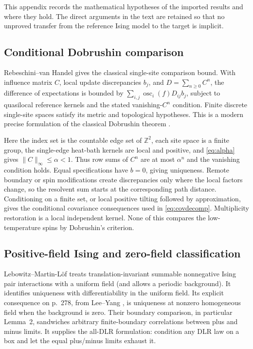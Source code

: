 \documentclass[11pt,reqno]{amsart}
\numberwithin{equation}{section}
\theoremstyle{definition}
\theoremstyle{remark}
\newcommand{\Z}{\mathbb Z}
\newcommand{\osc}{\operatorname{osc}}
\newcommand{\norm}[1]{\lVert#1\rVert}
\begin{document}
This appendix records the mathematical hypotheses of the imported results and where they hold. The direct arguments in the text are retained so that no unproved transfer from the reference Ising model to the target is implicit.

\subsection{Conditional Dobrushin comparison}
Rebeschini--van Handel \cite[Corollary~2.6, arXiv version~1]{RebeschiniVanHandel2014} gives the classical single-site comparison bound. With influence matrix $C$, local update discrepancies $b_j$, and $D=\sum_{n\geq0}C^n$, the difference of expectations is bounded by $\sum_{i,j}\osc_i(f)D_{ij}b_j$, subject to quasilocal reference kernels and the stated vanishing-$C^n$ condition. Finite discrete single-site spaces satisfy its metric and topological hypotheses. This is a modern precise formulation of the classical Dobrushin theorem \cite{Dobrushin1968}.

Here the index set is the countable edge set of $\Z^2$, each site space is a finite group, the single-edge heat-bath kernels are local and positive, and \eqref{eq:alpha} gives $\norm C_\infty\leq\alpha<1$. Thus row sums of $C^n$ are at most $\alpha^n$ and the vanishing condition holds. Equal specifications have $b=0$, giving uniqueness. Remote boundary or spin modifications create discrepancies only where the local factors change, so the resolvent sum starts at the corresponding path distance. Conditioning on a finite set, or local positive tilting followed by approximation, gives the conditional covariance consequences used in \eqref{eq:covdecomp}. Multiplicity restoration is a local independent kernel. None of this compares the low-temperature spins by Dobrushin's criterion.

\subsection{Positive-field Ising and zero-field classification}
Lebowitz--Martin-L\"of \cite[Theorem~1]{LebowitzMartinLof1972} treats translation-invariant summable nonnegative Ising pair interactions with a uniform field (and allows a periodic background). It identifies uniqueness with differentiability in the uniform field. Its explicit consequence on p.~278, from Lee--Yang \cite{LeeYang1952}, is uniqueness at nonzero homogeneous field when the background is zero. Their boundary comparison, in particular Lemma~2, sandwiches arbitrary finite-boundary correlations between plus and minus limits. It supplies the all-DLR formulation: condition any DLR law on a box and let the equal plus/minus limits exhaust it.
\end{document}
